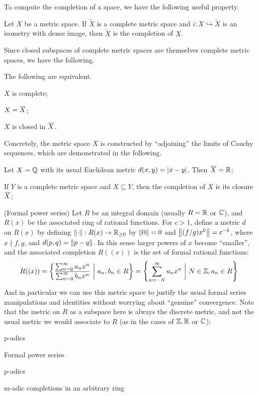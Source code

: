 \documentclass[11pt]{article}
\begin{document}
To compute the completion of a space, we have the following useful property.
\begin{corollary}
    Let $X$ be a metric space. If $\tilde X$ is a complete metric space and $i : X \hookrightarrow \tilde X$ is an isometry with dense image, then $\tilde X$ is the completion of $X$.
\end{corollary}
Since closed subspaces of complete metric spaces are themselves complete metric spaces, we have the following.
\begin{corollary}
    The following are equivalent.
    \begin{enum}
        \item $X$ is complete;
        \item $X = \overline{X}$;
        \item $X$ is closed in $\overline{X}$.
    \end{enum}
\end{corollary}
Concretely, the metric space $X$ is constructed by ``adjoining'' the limits of Cauchy sequences, which are demonstrated in the following.
\begin{example}
    \begin{enum2}
        \item Let $X = \mathbb{Q}$ with its usual Euclidean metric $d(x, y) = \left| x - y \right|$. Then $\overline{X} = \mathbb{R}$;
        \item If $Y$ is a complete metric space and $X \subseteq Y$, then the completion of $X$ is its closure $\overline{X}$;
        \item (Formal power series) Let $R$ be an integral domain (usually $R = \mathbb{R}$ or $\mathbb{C}$), and $R(x)$ be the associated ring of rational functions. For $c > 1$, define a metric $d$ on $R(x)$ by defining $\left\| \cdot \right\| : R(x) \to \mathbb{R}_{\geq 0}$ by $\left\| 0 \right\| = 0$ and $\left\| (f/g)x^k \right\| = c^{-k}$, where $x \nmid f, g$, and $d(p, q) = \left\| p - q \right\|$. In this sense larger powers of $x$ become ``smaller'', and the associated completion $R((x))$ is the set of formal rational functions: 
        $$
            R((x)) = \left\{  \frac{\sum_{n = 0}^\infty a_nx^n}{\sum_{n = 0}^\infty b_nx^n} \ \bigg| \ a_n, b_n \in R  \right\} = \left\{  \sum_{n = -N}^\infty a_nx^n \ \bigg| \ N \in \mathbb{Z}, a_n \in R  \right\}
        $$
        And in particular we can use this metric space to justify the usual formal series manipulations and identities without worrying about ``genuine'' convergence. Note that the metric on $R$ as a subspace here is always the discrete metric, and not the usual metric we would associate to $R$ (as in the cases of $\mathbb{Z}, \mathbb{R}$ or $\mathbb{C}$);
        \item p-adics
    \end{enum2}
\end{example}

Formal power series

p-adics

m-adic completions in an arbitrary ring
\end{document}
